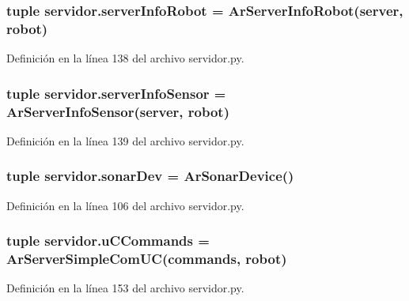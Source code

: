 \hypertarget{namespaceservidor_a214f853047fdc2f26cfac0db1a9e87b8}{
\subsubsection[{serverInfoRobot}]{\setlength{\rightskip}{0pt plus 5cm}tuple {\bf servidor.serverInfoRobot} = ArServerInfoRobot({\bf server}, {\bf robot})}}
\label{namespaceservidor_a214f853047fdc2f26cfac0db1a9e87b8}


Definición en la línea 138 del archivo servidor.py.

\hypertarget{namespaceservidor_ae93d5f481f48442f0db6959867fbf8c4}{
\subsubsection[{serverInfoSensor}]{\setlength{\rightskip}{0pt plus 5cm}tuple {\bf servidor.serverInfoSensor} = ArServerInfoSensor({\bf server}, {\bf robot})}}
\label{namespaceservidor_ae93d5f481f48442f0db6959867fbf8c4}


Definición en la línea 139 del archivo servidor.py.

\hypertarget{namespaceservidor_a509c8beb9fe73900b5ab2a0fc5f793b2}{
\subsubsection[{sonarDev}]{\setlength{\rightskip}{0pt plus 5cm}tuple {\bf servidor.sonarDev} = ArSonarDevice()}}
\label{namespaceservidor_a509c8beb9fe73900b5ab2a0fc5f793b2}


Definición en la línea 106 del archivo servidor.py.

\hypertarget{namespaceservidor_aa877c09d4a72ca2434441ff2dc406a29}{
\subsubsection[{uCCommands}]{\setlength{\rightskip}{0pt plus 5cm}tuple {\bf servidor.uCCommands} = ArServerSimpleComUC({\bf commands}, {\bf robot})}}
\label{namespaceservidor_aa877c09d4a72ca2434441ff2dc406a29}


Definición en la línea 153 del archivo servidor.py.

